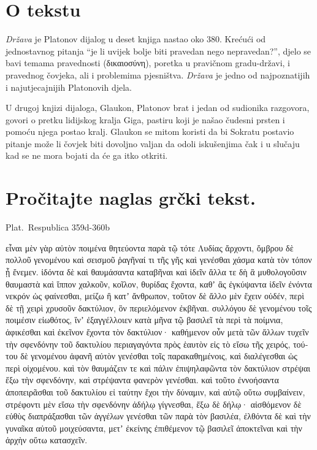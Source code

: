 
\section*{O tekstu}

\textit{Država} je Platonov dijalog u deset knjiga nastao oko 380. Krećući od jednostavnog pitanja ``je li uvijek bolje biti pravedan nego nepravedan?'', djelo se bavi temama pravednosti (δικαιοσύνη), poretka u pravičnom gradu-državi, i pravednog čovjeka, ali i problemima pjesništva. \textit{Država} je jedno od najpoznatijih i najutjecajnijih Platonovih djela.

U drugoj knjizi dijaloga, Glaukon, Platonov brat i jedan od sudionika razgovora, govori o pretku lidijskog kralja Giga, pastiru koji je našao čudesni prsten i pomoću njega postao kralj. Glaukon se mitom koristi da bi Sokratu postavio pitanje može li čovjek biti dovoljno valjan da odoli iskušenjima čak i u slučaju kad se ne mora bojati da će ga itko otkriti.



\section*{Pročitajte naglas grčki tekst.}

Plat.\ Respublica 359d-360b


\medskip


{\large

\begin{greek}

  \noindent εἶναι μὲν γὰρ αὐτὸν ποιμένα θητεύοντα παρὰ τῷ τότε Λυδίας ἄρχοντι, ὄμβρου δὲ πολλοῦ γενομένου καὶ σεισμοῦ ῥαγῆναί τι τῆς γῆς καὶ γενέσθαι χάσμα κατὰ τὸν τόπον ᾗ ἔνεμεν. ἰδόντα δὲ καὶ θαυμάσαντα καταβῆναι καὶ ἰδεῖν ἄλλα τε δὴ ἃ μυθολογοῦσιν θαυμαστὰ καὶ ἵππον χαλκοῦν, κοῖλον, θυρίδας ἔχοντα, καθʼ ἃς ἐγκύψαντα ἰδεῖν ἐνόντα νεκρόν ὡς φαίνεσθαι, μείζω ἢ κατʼ ἄνθρωπον, τοῦτον δὲ ἄλλο μὲν ἔχειν οὐδέν, περὶ δὲ τῇ χειρὶ χρυσοῦν δακτύλιον, ὃν περιελόμενον ἐκβῆναι. συλλόγου δὲ γενομένου τοῖς ποιμέσιν εἰωθότος, ἵνʼ ἐξαγγέλλοιεν κατὰ μῆνα τῷ βασιλεῖ τὰ περὶ τὰ ποίμνια, ἀφικέσθαι καὶ ἐκεῖνον ἔχοντα τὸν δακτύλιον· καθήμενον οὖν μετὰ τῶν ἄλλων τυχεῖν τὴν σφενδόνην τοῦ δακτυλίου περιαγαγόντα πρὸς ἑαυτὸν εἰς τὸ εἴσω τῆς χειρός, τούτου δὲ γενομένου ἀφανῆ αὐτὸν γενέσθαι τοῖς παρακαθημένοις, καὶ διαλέγεσθαι ὡς περὶ οἰχομένου. καὶ τὸν θαυμάζειν τε καὶ πάλιν ἐπιψηλαφῶντα τὸν δακτύλιον στρέψαι ἔξω τὴν σφενδόνην, καὶ στρέψαντα φανερὸν γενέσθαι. καὶ τοῦτο ἐννοήσαντα ἀποπειρᾶσθαι τοῦ δακτυλίου εἰ ταύτην ἔχοι τὴν δύναμιν, καὶ αὐτῷ οὕτω συμβαίνειν, στρέφοντι μὲν εἴσω τὴν σφενδόνην ἀδήλῳ γίγνεσθαι, ἔξω δὲ δήλῳ· αἰσθόμενον δὲ εὐθὺς διαπράξασθαι τῶν ἀγγέλων γενέσθαι τῶν παρὰ τὸν βασιλέα, ἐλθόντα δὲ καὶ τὴν γυναῖκα αὐτοῦ μοιχεύσαντα, μετʼ ἐκείνης ἐπιθέμενον τῷ βασιλεῖ ἀποκτεῖναι καὶ τὴν ἀρχὴν οὕτω κατασχεῖν.

\end{greek}

}


